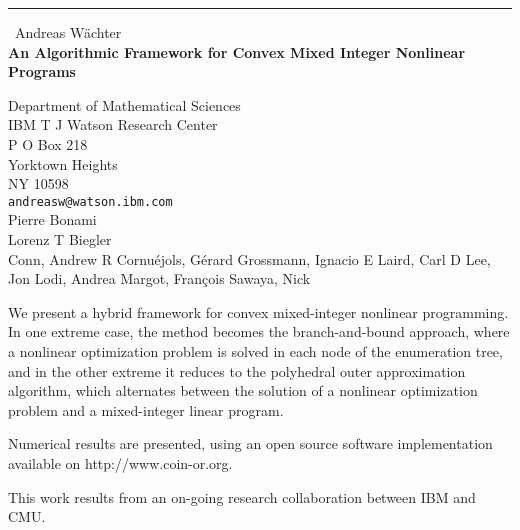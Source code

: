 \documentclass{report}
\begin{document}
\begin{center}
\rule{6in}{1pt} \
{\large Andreas W\"achter \\
{\bf An Algorithmic Framework for Convex Mixed Integer Nonlinear Programs}}

Department of Mathematical Sciences \\ IBM T J Watson Research Center \\ P O Box 218 \\ Yorktown Heights \\ NY 10598
\\
{\tt andreasw@watson.ibm.com}\\
Pierre Bonami\\
Lorenz T Biegler\\
	Conn, Andrew R
	Cornu\'ejols, G\'erard
	Grossmann, Ignacio E
	Laird, Carl D
	Lee, Jon
	Lodi, Andrea
	Margot, Fran\c{c}ois
	Sawaya, Nick\end{center}

We present a hybrid framework for convex mixed-integer nonlinear
programming. In one extreme case, the method becomes the
branch-and-bound approach, where a nonlinear optimization problem is
solved in each node of the enumeration tree, and in the other extreme
it reduces to the polyhedral outer approximation algorithm, which
alternates between the solution of a nonlinear optimization problem
and a mixed-integer linear program.

Numerical results are presented, using an open source software
implementation available on http://www.coin-or.org.

This work results from an on-going research collaboration between IBM and CMU.
\end{document}
